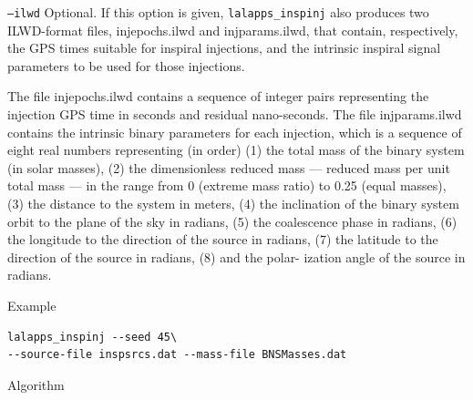 \begin{entry}
\begin{entry}
\item[\texttt{--ilwd}] Optional. If this option is given,
\verb+lalapps_inspinj+ also produces two ILWD-format files, injepochs.ilwd and
injparams.ilwd, that contain, respectively, the  GPS  times  suitable for
inspiral injections, and the intrinsic inspiral signal parameters to be used
for  those injections.

The  file  injepochs.ilwd  contains  a sequence of integer pairs representing
the injection GPS time in  seconds  and residual  nano-seconds.   The file
injparams.ilwd contains the intrinsic binary parameters for each injection,
which is  a  sequence  of  eight  real  numbers representing (in order) (1) the
total mass of the binary system  (in  solar masses),  (2)  the  dimensionless
reduced mass --- reduced mass per unit total mass --- in the range from  0
(extreme mass  ratio)  to  0.25 (equal masses), (3) the distance to the system
in meters, (4) the inclination  of  the  binary system  orbit  to the plane of
the sky in radians, (5) the coalescence phase in radians, (6)  the  longitude
to  the direction  of  the  source in radians, (7) the latitude to the
direction of the source in radians, (8) and the polar- ization angle of the
source in radians.
\end{entry}

\item[Example]
\begin{verbatim}
lalapps_inspinj --seed 45\
--source-file inspsrcs.dat --mass-file BNSMasses.dat
\end{verbatim}


\item[Algorithm]


\end{entry}
